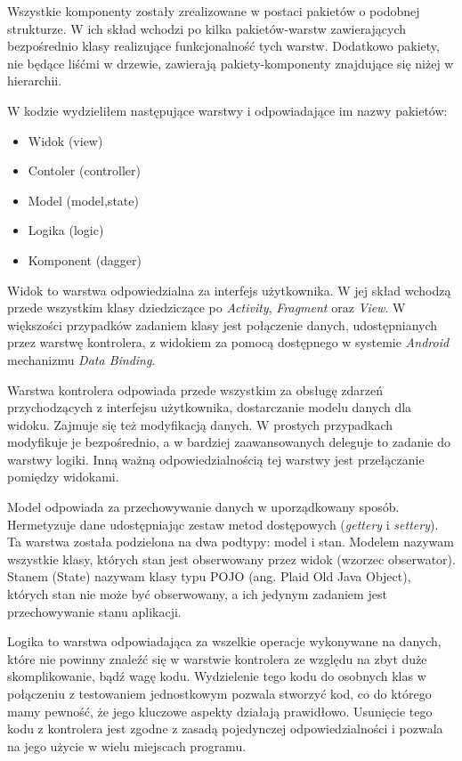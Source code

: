 \documentclass[openright]{xmgr}
\begin{document}
Wszystkie komponenty zostały zrealizowane w postaci pakietów o podobnej strukturze. W ich skład wchodzi po kilka pakietów-warstw zawierających bezpośrednio klasy realizujące funkcjonalność tych warstw. Dodatkowo pakiety, nie będące liśćmi w drzewie, zawierają pakiety-komponenty znajdujące się niżej w hierarchii.

W kodzie wydzieliłem następujące warstwy i odpowiadające im nazwy pakietów:
\begin{itemize}
	\item Widok (view)
	\item Contoler (controller)
	\item Model (model,state)
	\item Logika (logic)
	\item Komponent (dagger)
\end{itemize}

Widok to warstwa odpowiedzialna za interfejs użytkownika. W jej skład wchodzą przede wszystkim klasy dziedziczące po \textit{Activity}, \textit{Fragment} oraz \textit{View}. W większości przypadków zadaniem klasy jest połączenie danych, udostępnianych przez warstwę kontrolera, z widokiem za pomocą dostępnego w systemie \textit{Android} mechanizmu \textit{Data Binding}\cite{AndroidSDK:2017:Doc}.

Warstwa kontrolera odpowiada przede wszystkim za obsługę zdarzeń przychodzących z interfejsu użytkownika, dostarczanie modelu danych dla widoku. Zajmuje się też modyfikacją danych. W prostych przypadkach modyfikuje je bezpośrednio, a w bardziej zaawansowanych deleguje to zadanie do warstwy logiki. Inną ważną odpowiedzialnością tej warstwy jest przełączanie pomiędzy widokami. 

Model odpowiada za przechowywanie danych w uporządkowany sposób. Hermetyzuje dane udostępniając zestaw metod dostępowych (\textit{gettery} i \textit{settery}). Ta warstwa została podzielona na dwa podtypy: model i stan. Modelem nazywam wszystkie klasy, których stan jest obserwowany przez widok (wzorzec obserwator). Stanem (State) nazywam klasy typu POJO (ang. Plaid Old Java Object), których stan nie może być obserwowany, a ich jedynym zadaniem jest przechowywanie stanu aplikacji. 

Logika to warstwa odpowiadająca za wszelkie operacje wykonywane na danych, które nie powinny znaleźć się w warstwie kontrolera ze względu na zbyt duże skomplikowanie, bądź wagę kodu. Wydzielenie tego kodu do osobnych klas w połączeniu z testowaniem jednostkowym pozwala stworzyć kod, co do którego mamy pewność, że jego kluczowe aspekty działają prawidłowo. Usunięcie tego kodu z kontrolera jest zgodne z zasadą pojedynczej odpowiedzialności \cite{CleanCode:2005} i pozwala na jego użycie w wielu miejscach programu. 
\end{document}
